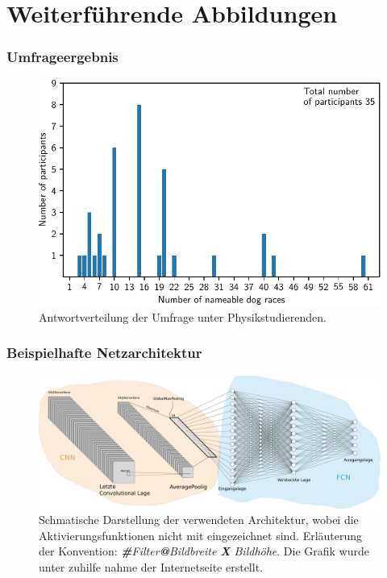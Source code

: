 \FloatBarrier
\section{Weiterführende Abbildungen}
\subsubsection{Umfrageergebnis}
\begin{figure}
\centering
\includegraphics[width=\the\textwidth]{./survey/answers_plot.pdf}
\caption{Antwortverteilung der Umfrage unter Physikstudierenden.}
\label{fig:Antwortverteilung}
\end{figure}

\subsubsection{Beispielhafte Netzarchitektur}
\begin{figure}
\centering
\includegraphics[width=\the\textwidth]{../../final_data/general/sample_network.pdf}
\caption{Schmatische Darstellung der verwendeten Architektur, wobei
         die Aktivierungsfunktionen nicht mit eingezeichnet sind. Erläuterung der Konvention: \emph{\textbf{\#}Filter\textbf{@}Bildbreite \textbf{X} Bildhöhe}.
         Die Grafik wurde unter zuhilfe nahme der Internetseite \cite{net_svg_source} erstellt.}
\label{fig:beispielhafte_netz_architecture}
\end{figure}

